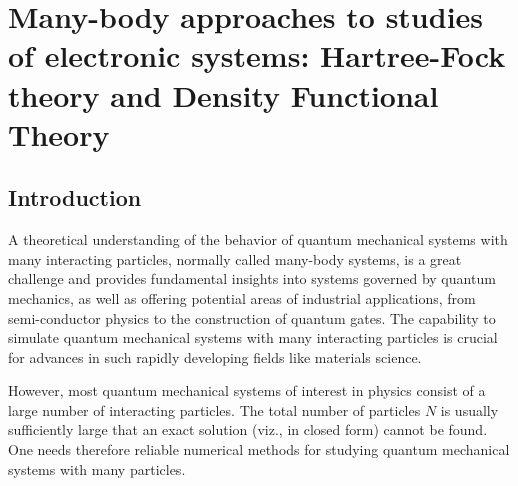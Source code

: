 \chapter{Many-body approaches to studies of electronic systems: Hartree-Fock theory and Density Functional Theory}\label{chap:advancedatoms}

\section{Introduction}
A theoretical understanding of the behavior of quantum mechanical systems  
with many interacting particles, normally called
many-body systems,  
is a  great challenge and provides fundamental insights into systems governed by quantum mechanics, as well 
as offering potential areas of industrial applications, from semi-conductor physics  to the construction of quantum 
gates.  
The capability to simulate quantum mechanical systems with many interacting particles is crucial for advances
in such rapidly developing fields like materials science.

However, 
most  quantum mechanical systems of interest in  physics consist of a large number of
interacting particles.
The total number of particles $N$ is usually sufficiently large
that an exact solution (viz., in closed form) cannot be found.  One needs therefore reliable numerical methods
for studying quantum mechanical systems with many particles.


